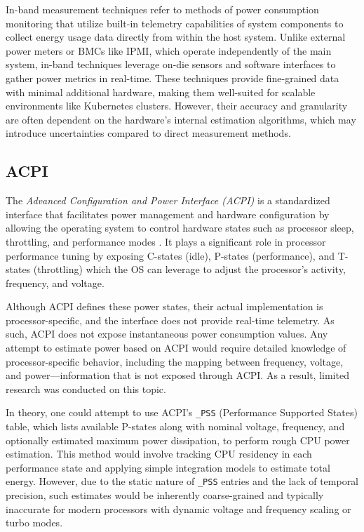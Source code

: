 In-band measurement techniques refer to methods of power consumption monitoring that utilize built-in telemetry capabilities of system components to collect energy usage data directly from within the host system. Unlike external power meters or BMCs like IPMI, which operate independently of the main system, in-band techniques leverage on-die sensors and software interfaces to gather power metrics in real-time. These techniques provide fine-grained data with minimal additional hardware, making them well-suited for scalable environments like Kubernetes clusters. However, their accuracy and granularity are often dependent on the hardware's internal estimation algorithms, which may introduce uncertainties compared to direct measurement methods.

\subsection{ACPI}

The \textit{Advanced Configuration and Power Interface (ACPI)} is a standardized interface that facilitates power management and hardware configuration by allowing the operating system to control hardware states such as processor sleep, throttling, and performance modes \cite{uefi_acpi_6_6}. It plays a significant role in processor performance tuning by exposing C-states (idle), P-states (performance), and T-states (throttling) which the OS can leverage to adjust the processor's activity, frequency, and voltage.

Although ACPI defines these power states, their actual implementation is processor-specific, and the interface does not provide real-time telemetry. As such, ACPI does not expose instantaneous power consumption values. Any attempt to estimate power based on ACPI would require detailed knowledge of processor-specific behavior, including the mapping between frequency, voltage, and power—information that is not exposed through ACPI. As a result, limited research was conducted on this topic.

In theory, one could attempt to use ACPI's \texttt{\_PSS} (Performance Supported States) table, which lists available P-states along with nominal voltage, frequency, and optionally estimated maximum power dissipation, to perform rough CPU power estimation. This method would involve tracking CPU residency in each performance state and applying simple integration models to estimate total energy. However, due to the static nature of \texttt{\_PSS} entries and the lack of temporal precision, such estimates would be inherently coarse-grained and typically inaccurate for modern processors with dynamic voltage and frequency scaling or turbo modes.

